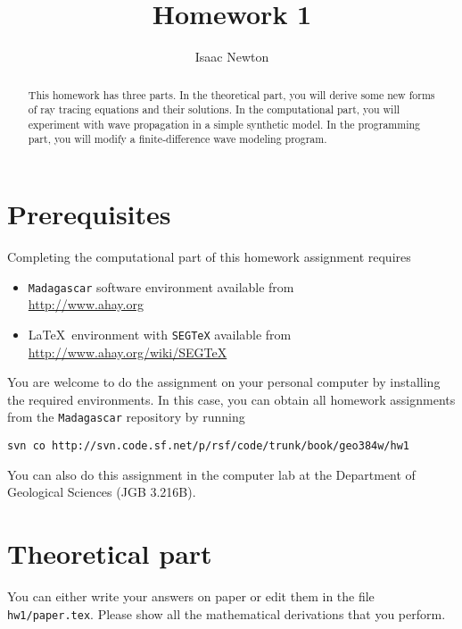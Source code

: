 \author{Isaac Newton} 
\title{Homework 1}


\begin{abstract}
  This homework has three parts. In the theoretical part, you will
  derive some new forms of ray tracing equations and their solutions.
  In the computational part, you will experiment with wave propagation
  in a simple synthetic model.  In the programming part, you will
  modify a finite-difference wave modeling program.
\end{abstract}

\section{Prerequisites}

Completing the computational part of this homework assignment requires
\begin{itemize}
\item \texttt{Madagascar} software environment available from \\
\url{http://www.ahay.org}
\item \LaTeX\ environment with \texttt{SEGTeX} available from \\ 
\url{http://www.ahay.org/wiki/SEGTeX}
\end{itemize}

You are welcome to do the assignment on your personal computer by
installing the required environments. In this case, you can obtain all
homework assignments from the \texttt{Madagascar} repository by running
\begin{verbatim}
svn co http://svn.code.sf.net/p/rsf/code/trunk/book/geo384w/hw1
\end{verbatim}

You can also do this assignment in the computer lab at the Department
of Geological Sciences (JGB 3.216B).

\section{Theoretical part}

You can either write your answers on paper or edit them in the file
\verb#hw1/paper.tex#. Please show all the mathematical
derivations that you perform.

